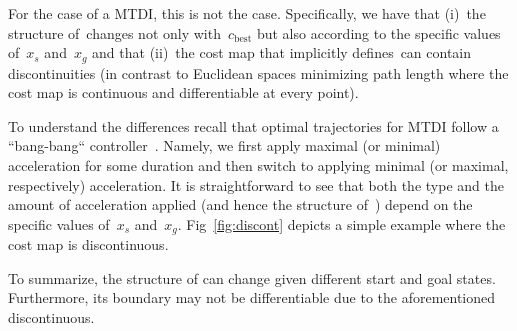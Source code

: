 \documentclass[letterpaper, 10 pt, conference]{ieeeconf}  %
\begin{document}
For the case of a MTDI, this is not the case. 
Specifically, we have that 
(i)~the structure of~\Cinf changes not only with~$c_{\text{best}}$ but also according to the specific values of~$x_s$ and~$x_g$ 
and that
(ii)~the cost map that implicitly defines~\Cinf can contain discontinuities (in contrast to Euclidean spaces minimizing path length where the cost map is continuous and differentiable at every point).

To understand the differences recall that optimal trajectories  for MTDI follow a ``bang-bang`` controller~\cite{HN10, KS14}.
Namely, we first apply maximal (or minimal) acceleration for some duration and then switch to applying minimal (or maximal, respectively) acceleration.
It is straightforward to see that both the type and the amount of acceleration applied (and hence the structure of~\Cinf) depend on the specific values of~$x_s$ and~$x_g$. 
Fig~\ref{fig:discont} depicts a simple example where the cost map is discontinuous.

To summarize, the structure of \Cinf can change given different start and goal states.
Furthermore,  its boundary may not be  differentiable due to the aforementioned discontinuous. 
\end{document}
